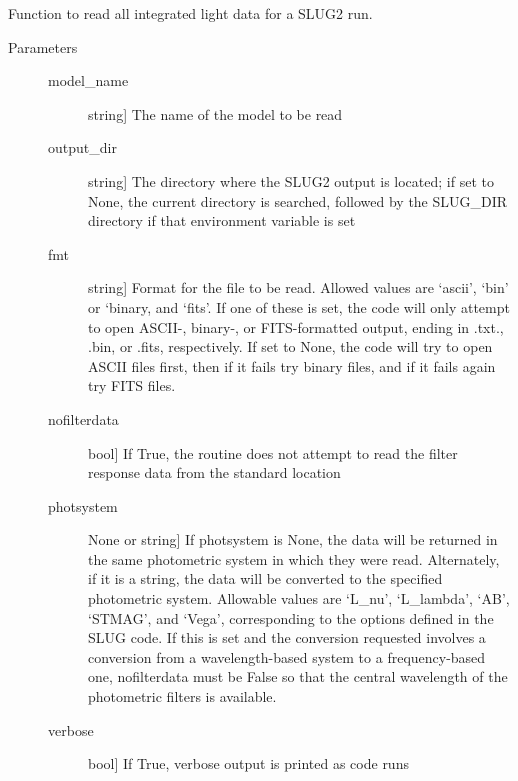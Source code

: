 \documentclass[letterpaper,10pt,english]{sphinxmanual}
\begin{document}

\begin{fulllineitems}
\label{\detokenize{slugpy:slugpy.read_integrated}}
Function to read all integrated light data for a SLUG2 run.
\begin{description}
\item[{Parameters}] \leavevmode\begin{description}
\item[{model\_name}] \leavevmode{[}string{]}
The name of the model to be read

\item[{output\_dir}] \leavevmode{[}string{]}
The directory where the SLUG2 output is located; if set to None,
the current directory is searched, followed by the SLUG\_DIR
directory if that environment variable is set

\item[{fmt}] \leavevmode{[}string{]}
Format for the file to be read. Allowed values are ‘ascii’,
‘bin’ or ‘binary, and ‘fits’. If one of these is set, the code
will only attempt to open ASCII-, binary-, or FITS-formatted
output, ending in .txt., .bin, or .fits, respectively. If set
to None, the code will try to open ASCII files first, then if
it fails try binary files, and if it fails again try FITS
files.

\item[{nofilterdata}] \leavevmode{[}bool{]}
If True, the routine does not attempt to read the filter
response data from the standard location

\item[{photsystem}] \leavevmode{[}None or string{]}
If photsystem is None, the data will be returned in the same
photometric system in which they were read. Alternately, if it
is a string, the data will be converted to the specified
photometric system. Allowable values are ‘L\_nu’, ‘L\_lambda’,
‘AB’, ‘STMAG’, and ‘Vega’, corresponding to the options defined
in the SLUG code. If this is set and the conversion requested
involves a conversion from a wavelength-based system to a
frequency-based one, nofilterdata must be False so that the
central wavelength of the photometric filters is available.

\item[{verbose}] \leavevmode{[}bool{]}
If True, verbose output is printed as code runs


\end{description}
\end{description}
\end{fulllineitems}
\end{document}
